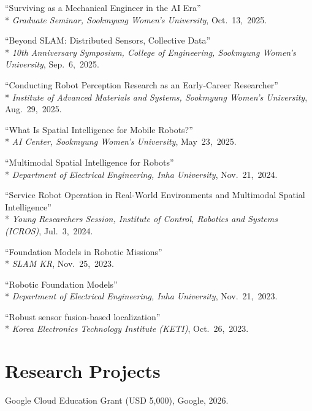 \documentclass[margin]{res}
\begin{document}
\begin{resume}
		\par ``Surviving as a Mechanical Engineer in the AI Era''\\*
		\textit{Graduate Seminar, Sookmyung Women's University}, Oct.~13,~2025.

		\par ``Beyond SLAM: Distributed Sensors, Collective Data''\\*
		\textit{10th Anniversary Symposium, College of Engineering, Sookmyung Women's University}, Sep.~6,~2025.

		\par ``Conducting Robot Perception Research as an Early-Career Researcher''\\*
		\textit{Institute of Advanced Materials and Systems, Sookmyung Women's University}, Aug.~29,~2025.

		\par ``What Is Spatial Intelligence for Mobile Robots?''\\*
		\textit{AI Center, Sookmyung Women's University}, May~23,~2025.

		\par ``Multimodal Spatial Intelligence for Robots''\\*
		\textit{Department of Electrical Engineering, Inha University}, Nov.~21,~2024.

		\par ``Service Robot Operation in Real-World Environments and Multimodal Spatial Intelligence''\\*
		\textit{Young Researchers Session, Institute of Control, Robotics and Systems (ICROS)}, Jul.~3,~2024.

		\par ``Foundation Models in Robotic Missions''\\*
		\textit{SLAM KR}, Nov.~25,~2023.

		\par ``Robotic Foundation Models''\\*
		\textit{Department of Electrical Engineering, Inha University}, Nov.~21,~2023.

		\par ``Robust sensor fusion-based localization''\\*
		\textit{Korea Electronics Technology Institute (KETI)}, Oct.~26,~2023.
		\par\endgroup
		\newpage
		\section{Research Projects}
		\par Google Cloud Education Grant (USD 5,000), Google, 2026.


\end{resume}
\end{document}
